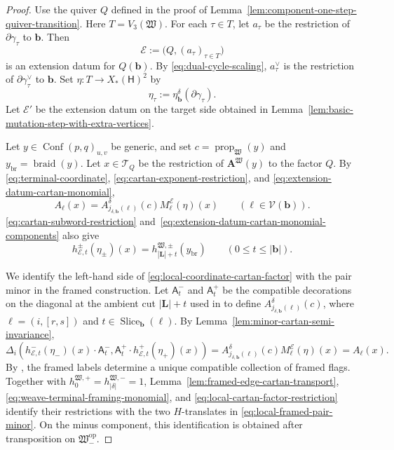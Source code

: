 \documentclass[10pt,a4paper]{article}
\theoremstyle{definition}
\theoremstyle{remark}
\newcommand{\flagA}{\mathsf{A}}
\newcommand{\torusH}{\mathsf{H}}
\newcommand{\Conf}{\operatorname{Conf}}
\newcommand{\Tcal}{\mathcal T}
\newcommand{\Vcal}{\mathcal V}
\newcommand{\fW}{\mathfrak W}
\begin{document}
\begin{proof}
Use the quiver \(Q\) defined in the proof of
Lemma~\ref{lem:component-one-step-quiver-transition}.  Here
\(T=V_3(\fW)\).  For each \(\tau\in T\), let \(a_\tau\) be the restriction
of \(\partial\gamma_\tau\) to \(\mathbf b\).  Then
\[
 \mathcal E:=\bigl(Q,(a_\tau)_{\tau\in T}\bigr)
\]
is an extension datum for \(Q(\mathbf b)\).  By
\eqref{eq:dual-cycle-scaling}, \(a_\tau^\vee\) is the restriction of
\(\partial\gamma_\tau^\vee\) to \(\mathbf b\).  Set
\(\eta:T\to X_*(\torusH)^2\) by
\[
 \eta_\tau:=\eta_{\mathbf b}^\delta(\partial\gamma_\tau).
\]
Let \(\mathcal E'\) be the extension datum on the target side obtained in
Lemma~\ref{lem:basic-mutation-step-with-extra-vertices}.

Let \(y\in\Conf(p,q)_{u,v}\) be generic, and set
\(c=\operatorname{prop}_\fW(y)\) and
\(y_{\mathrm{br}}=\operatorname{braid}(y)\).  Let \(x\in\Tcal_Q\) be the
restriction of \(\mathbf A^\fW(y)\) to the factor \(Q\).  By
\eqref{eq:terminal-coordinate}, \eqref{eq:cartan-exponent-restriction}, and
\eqref{eq:extension-datum-cartan-monomial},
\begin{equation}
 A_\ell(x)
 =A_{j_{\delta,\mathbf b}(\ell)}^\delta(c)
  M_\ell^{\mathcal E}(\eta)(x)
 \qquad(\ell\in\Vcal(\mathbf b)).
 \label{eq:local-coordinate-cartan-factor}
\end{equation}
\eqref{eq:cartan-subword-restriction}
and~\eqref{eq:extension-datum-cartan-monomial-components} also give
\begin{equation}
 h_{\mathcal E,t}^\pm(\eta_\pm)(x)
 =h_{|\mathbf L|+t}^{\fW,\pm}(y_{\mathrm{br}})
 \qquad(0\le t\le|\mathbf b|).
 \label{eq:local-cartan-factor-restriction}
\end{equation}

We identify the left-hand side of
\eqref{eq:local-coordinate-cartan-factor} with the pair minor in the framed
construction.  Let \(\flagA_t^-\) and \(\flagA_t^+\) be the compatible
decorations on the diagonal at the ambient cut \(|\mathbf L|+t\) used in
\cite[Definition~3.20]{ShenWeng2021} to define
\(A_{j_{\delta,\mathbf b}(\ell)}^\delta(c)\), where
\(\ell=(i,[r,s])\) and
\(t\in\operatorname{Slice}_{\mathbf b}(\ell)\).  By
Lemma~\ref{lem:minor-cartan-semi-invariance},
\begin{equation}
 \Delta_i\left(
   h_{\mathcal E,t}^-(\eta_-)(x)\mathbin{\cdot}\flagA_t^-,
   \flagA_t^+\mathbin{\cdot}h_{\mathcal E,t}^+(\eta_+)(x)
  \right)=
 A_{j_{\delta,\mathbf b}(\ell)}^\delta(c)
 M_\ell^{\mathcal E}(\eta)(x)
 =A_\ell(x).
 \label{eq:local-framed-pair-minor}
\end{equation}
By \cite[Proposition~3.11, Definition~5.8, Lemma~5.9, and Theorem~5.12]
{CasalsEtAlBraidVarieties}, the framed labels determine a unique compatible
collection of framed flags.  Together with
\(h_0^{\fW,+}=h_{|\delta|}^{\fW,-}=1\),
Lemma~\ref{lem:framed-edge-cartan-transport},
\eqref{eq:weave-terminal-framing-monomial}, and
\eqref{eq:local-cartan-factor-restriction} identify their restrictions with
the two \(H\)-translates in \eqref{eq:local-framed-pair-minor}.  On the minus
component, this identification is obtained after transposition on
\(\fW_-^{\mathrm{op}}\).


\end{proof}
\end{document}
